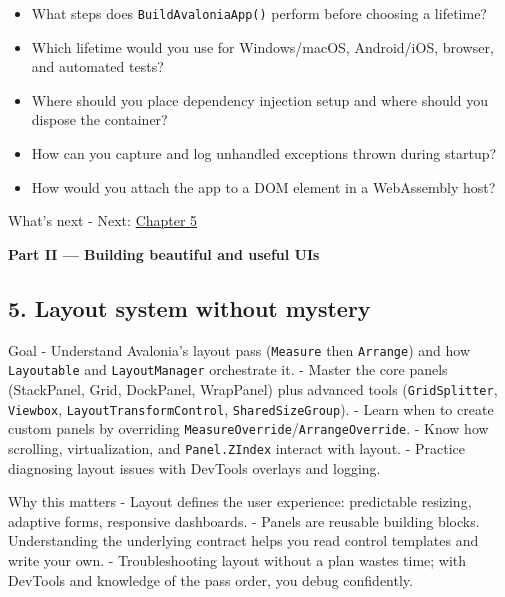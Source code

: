 \begin{itemize}
\tightlist
\item
  What steps does \passthrough{\lstinline!BuildAvaloniaApp()!} perform
  before choosing a lifetime?
\item
  Which lifetime would you use for Windows/macOS, Android/iOS, browser,
  and automated tests?
\item
  Where should you place dependency injection setup and where should you
  dispose the container?
\item
  How can you capture and log unhandled exceptions thrown during
  startup?
\item
  How would you attach the app to a DOM element in a WebAssembly host?
\end{itemize}

What's next - Next: \href{Chapter05.md}{Chapter 5}

\clearpage
{}
{}
\thispagestyle{empty}
\vspace*{\fill}
\begin{center}
{\Huge\bfseries Part II — Building beautiful and useful UIs}
\end{center}
\vspace*{\fill}
\clearpage

\newpage

\subsection{5. Layout system without
mystery}\label{layout-system-without-mystery}

Goal - Understand Avalonia's layout pass
(\passthrough{\lstinline!Measure!} then
\passthrough{\lstinline!Arrange!}) and how
\passthrough{\lstinline!Layoutable!} and
\passthrough{\lstinline!LayoutManager!} orchestrate it. - Master the
core panels (StackPanel, Grid, DockPanel, WrapPanel) plus advanced tools
(\passthrough{\lstinline!GridSplitter!},
\passthrough{\lstinline!Viewbox!},
\passthrough{\lstinline!LayoutTransformControl!},
\passthrough{\lstinline!SharedSizeGroup!}). - Learn when to create
custom panels by overriding
\passthrough{\lstinline!MeasureOverride!}/\passthrough{\lstinline!ArrangeOverride!}.
- Know how scrolling, virtualization, and
\passthrough{\lstinline!Panel.ZIndex!} interact with layout. - Practice
diagnosing layout issues with DevTools overlays and logging.

Why this matters - Layout defines the user experience: predictable
resizing, adaptive forms, responsive dashboards. - Panels are reusable
building blocks. Understanding the underlying contract helps you read
control templates and write your own. - Troubleshooting layout without a
plan wastes time; with DevTools and knowledge of the pass order, you
debug confidently.

